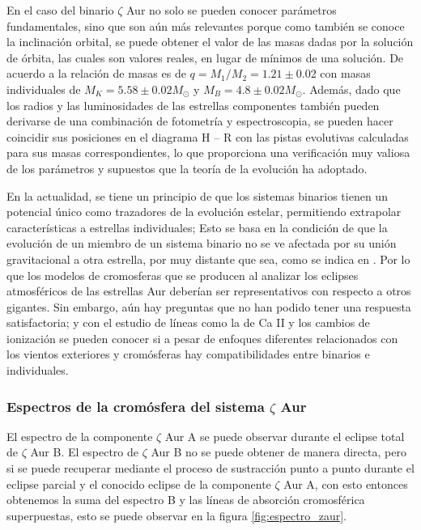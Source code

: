 \documentclass[12pt,oneside,openany,letter]{book}
\begin{document}
\noindent En el caso del binario $\zeta$ Aur no solo se pueden conocer parámetros fundamentales, sino que son aún más relevantes porque como también se conoce la inclinación orbital, se puede obtener el valor de las masas dadas por la solución de órbita, las cuales son valores reales, en lugar de mínimos de una solución. De acuerdo a \citep{bennett1995non} la relación de masas es de $q = M_1/M_2 = 1.21 \pm 0.02$ con masas individuales de $M_K = 5.58 \pm 0.02 M_\odot$ y $M_B = 4.8  \pm 0.02 M_{\odot}$. Además, dado que los radios y las luminosidades de las estrellas componentes también pueden derivarse de una combinación de fotometría y espectroscopia, se pueden hacer coincidir sus posiciones en el diagrama H – R con las pistas evolutivas calculadas \citep{schroder1997critical} para sus masas correspondientes, lo que proporciona una verificación muy valiosa de los parámetros y supuestos que la teoría de la evolución ha adoptado.

\noindent En la actualidad, se tiene un principio de que los sistemas binarios tienen un potencial único como trazadores de la evolución estelar, permitiendo extrapolar características a estrellas individuales; Esto se basa en la condición de que la evolución de un miembro de un sistema binario no se ve afectada por su unión gravitacional a otra estrella, por muy distante que sea, como se indica en \citep{schroder1997critical}. Por lo que los modelos de cromosferas que se producen al analizar los eclipses atmosféricos de las estrellas Aur deberían ser representativos con respecto a otros gigantes. Sin embargo, aún hay preguntas que no han podido tener una respuesta satisfactoria; y con el estudio de líneas como la de Ca II y los cambios de ionización se pueden conocer si a pesar de enfoques diferentes relacionados con los vientos exteriores y cromósferas hay compatibilidades entre binarios e individuales.

\subsubsection{Espectros de la cromósfera del  sistema $\zeta$ Aur}

El espectro de la componente $\zeta$ Aur A se puede observar durante el eclipse total de $\zeta$ Aur B. El espectro de $\zeta$ Aur B no se puede obtener de manera directa, pero si se puede recuperar mediante el proceso de sustracción punto a punto durante el eclipse parcial y el conocido eclipse de la componente $\zeta$ Aur A, con esto entonces obtenemos la suma del espectro B y las líneas de absorción cromosférica superpuestas, esto se puede observar en la figura \ref{fig:espectro_zaur}.
\end{document}
